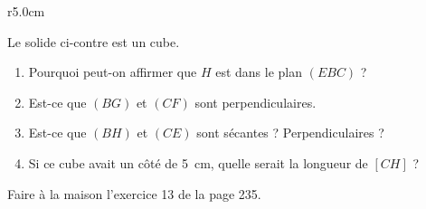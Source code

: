 
\begin{exercice}\label{exoSeconde-0087}

\begin{wrapfigure}{r}{5.0cm}
    \vspace{-1cm}
    \centering
    
\end{wrapfigure}

        Le solide ci-contre est un cube. 
        \begin{enumerate}
            \item
                Pourquoi peut-on affirmer que \( H\) est dans le plan \( (EBC)\) ?
            \item
                Est-ce que \( (BG)\) et \( (CF)\) sont perpendiculaires.
            \item
                Est-ce que \( (BH)\) et \( (CE)\) sont sécantes ? Perpendiculaires ?
            \item
                Si ce cube avait un côté de \SI{5}{\centi\meter}, quelle serait la longueur de \( [CH]\) ?
        \end{enumerate}

        Faire à la maison l'exercice 13 de la page 235.

\end{exercice}
